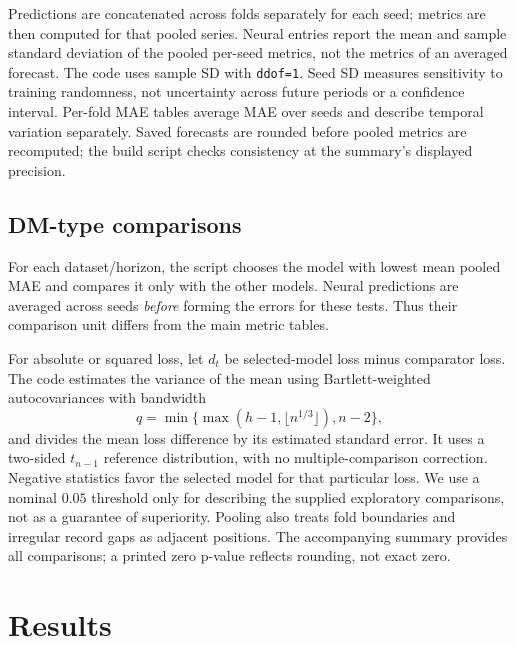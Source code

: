 \documentclass[10pt,a4paper]{article}
\begin{document}
Predictions are concatenated across folds separately for each seed; metrics are then computed for that pooled series. Neural entries report the mean and sample standard deviation of the pooled per-seed metrics, not the metrics of an averaged forecast. The code uses sample SD with \texttt{ddof=1}. Seed SD measures sensitivity to training randomness, not uncertainty across future periods or a confidence interval. Per-fold MAE tables average MAE over seeds and describe temporal variation separately. Saved forecasts are rounded before pooled metrics are recomputed; the build script checks consistency at the summary's displayed precision.

\subsection{DM-type comparisons}
For each dataset/horizon, the script chooses the model with lowest mean pooled MAE and compares it only with the other models. Neural predictions are averaged across seeds \emph{before} forming the errors for these tests. Thus their comparison unit differs from the main metric tables.

For absolute or squared loss, let $d_t$ be selected-model loss minus comparator loss. The code estimates the variance of the mean using Bartlett-weighted autocovariances with bandwidth
\[
q=\min\{\max(h-1,\lfloor n^{1/3}\rfloor),n-2\},
\]
and divides the mean loss difference by its estimated standard error. It uses a two-sided $t_{n-1}$ reference distribution, with no multiple-comparison correction. Negative statistics favor the selected model for that particular loss. We use a nominal $0.05$ threshold only for describing the supplied exploratory comparisons, not as a guarantee of superiority. Pooling also treats fold boundaries and irregular record gaps as adjacent positions. The accompanying summary provides all comparisons; a printed zero p-value reflects rounding, not exact zero.

\section{Results}
\end{document}
